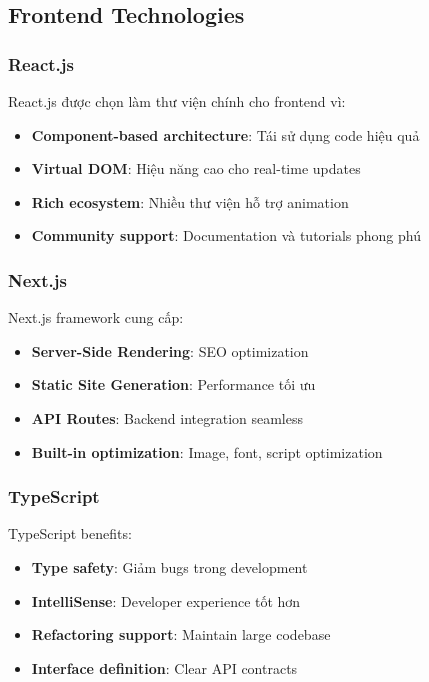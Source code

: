 \subsection{Frontend Technologies}
\label{subsec:frontend-tech}

\subsubsection{React.js}
React.js được chọn làm thư viện chính cho frontend vì:
\begin{itemize}
    \item \textbf{Component-based architecture}: Tái sử dụng code hiệu quả
    \item \textbf{Virtual DOM}: Hiệu năng cao cho real-time updates
    \item \textbf{Rich ecosystem}: Nhiều thư viện hỗ trợ animation
    \item \textbf{Community support}: Documentation và tutorials phong phú
\end{itemize}

\subsubsection{Next.js}
Next.js framework cung cấp:
\begin{itemize}
    \item \textbf{Server-Side Rendering}: SEO optimization
    \item \textbf{Static Site Generation}: Performance tối ưu
    \item \textbf{API Routes}: Backend integration seamless
    \item \textbf{Built-in optimization}: Image, font, script optimization
\end{itemize}

\subsubsection{TypeScript}
TypeScript benefits:
\begin{itemize}
    \item \textbf{Type safety}: Giảm bugs trong development
    \item \textbf{IntelliSense}: Developer experience tốt hơn
    \item \textbf{Refactoring support}: Maintain large codebase
    \item \textbf{Interface definition}: Clear API contracts
\end{itemize}

